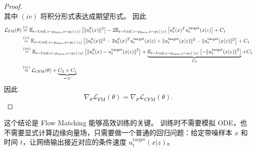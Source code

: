 \begin{proof}
\begin{equation*}
\end{equation*}
其中 $(iv)$ 将积分形式表达成期望形式。
因此
\begin{equation*}
\begin{aligned}
\mathcal{L}_{\mathrm{FM}}(\theta) & \overset{(i)}{=} \mathbb{E}_{t \sim \text{Unif}, z \sim p_{\mathrm{data}}, x \sim p_t(\cdot | z)}\left[\|u_t^\theta(x)\|^2\right] - 2\mathbb{E}_{t \sim \text{Unif}, z \sim p_{\mathrm{data}}, x \sim p_t(\cdot | z)}\left[u_t^\theta(x)^T u_t^{\mathrm{target}}(x | z)\right] + C_1 \\
& \overset{(ii)}{=} \mathbb{E}_{t \sim \text{Unif}, z \sim p_{\mathrm{data}}, x \sim p_t(\cdot | z)}\left[\|u_t^\theta(x)\|^2 - 2u_t^\theta(x)^T u_t^{\mathrm{target}}(x | z) + \|u_t^{\mathrm{target}}(x | z)\|^2 - \|u_t^{\mathrm{target}}(x | z)\|^2\right] + C_1 \\
& \overset{(iii)}{=} \mathbb{E}_{t \sim \text{Unif}, z \sim p_{\mathrm{data}}, x \sim p_t(\cdot | z)}\left[\|u_t^\theta(x) - u_t^{\mathrm{target}}(x | z)\|^2\right] + \underbrace{\mathbb{E}_{t \sim \text{Unif}, z \sim p_{\mathrm{data}}, x \sim p_t(\cdot | z)}\left[-\|u_t^{\mathrm{target}}(x | z)\|^2\right]}_{C_2} + C_1 \\
& \overset{(iv)}{=} \mathcal{L}_{\mathrm{CFM}}(\theta) + \underbrace{C_2 + C_1}_{=: C}
\end{aligned}
\end{equation*}
因此
\[
\nabla_\theta \mathcal{L}_{\mathrm{FM}}(\theta)
=
\nabla_\theta \mathcal{L}_{\mathrm{CFM}}(\theta).
\]
\end{proof}

这个结论是 Flow Matching 能够高效训练的关键。
训练时不需要模拟 ODE，也不需要显式计算边缘向量场，只需要做一个普通的回归问题：给定带噪样本 $x$ 和时间 $t$，让网络输出接近对应的条件速度 $u_t^{\mathrm{target}}(x | z)$。

